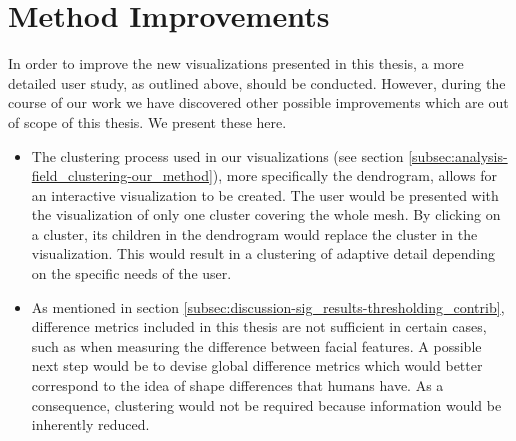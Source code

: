 \section{Method Improvements}
\label{sec:discussion-method_improvements}

In order to improve the new visualizations presented in this thesis, a more detailed user study, as outlined above, should be conducted. However, during the course of our work we have discovered other possible improvements which are out of scope of this thesis. We present these here.

\begin{itemize}
	\item The clustering process used in our visualizations (see section \ref{subsec:analysis-field_clustering-our_method}), more specifically the dendrogram, allows for an interactive visualization to be created. The user would be presented with the visualization of only one cluster covering the whole mesh. By clicking on a cluster, its children in the dendrogram would replace the cluster in the visualization. This would result in a clustering of adaptive detail depending on the specific needs of the user.
	\item As mentioned in section \ref{subsec:discussion-sig_results-thresholding_contrib}, difference metrics included in this thesis are not sufficient in certain cases, such as when measuring the difference between facial features. A possible next step would be to devise global difference metrics which would better correspond to the idea of shape differences that humans have. As a consequence, clustering would not be required because information would be inherently reduced.
\end{itemize}
